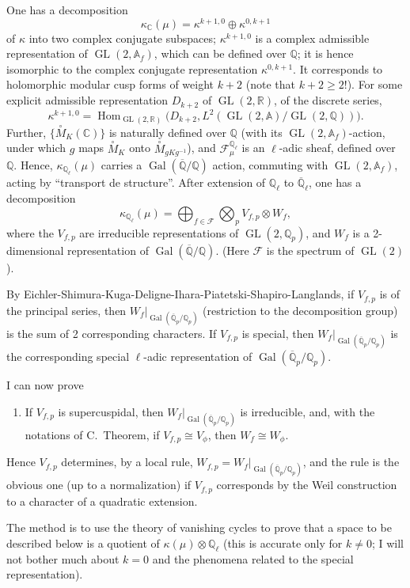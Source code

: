 \documentclass[11pt,a4paper]{article}
\theoremstyle{plain}
\theoremstyle{definition}
\theoremstyle{remark}
\DeclareMathOperator{\Hom}{Hom}
\DeclareMathOperator{\Gal}{Gal}
\DeclareMathOperator{\GL}{GL}
\newcommand{\C}{\mathbb{C}}
\newcommand{\Q}{\mathbb{Q}}
\newcommand{\R}{\mathbb{R}}
\newcommand{\Af}{\mathbb{A}_{f}}
\newcommand{\Qpbar}{\overline{\mathbb{Q}}_{p}}
\newcommand{\Qp}{\mathbb{Q}_{p}}
\newcommand{\Ql}{\mathbb{Q}_{\ell}}
\newcommand{\Qlbar}{\overline{\mathbb{Q}}_{\ell}}
\begin{document}
One has a decomposition
\[
\kappa_{\C}(\mu) = \kappa^{k+1,0} \oplus \kappa^{0,k+1}
\]
of $\kappa$ into two complex conjugate subspaces; $\kappa^{k+1,0}$ is a complex admissible representation of $\GL(2, \Af)$, which can be defined over $\Q$; it is hence isomorphic to the complex conjugate representation $\kappa^{0,k+1}$. It corresponds to holomorphic modular cusp forms of weight $k+2$ (note that $k+2 \geq 2$!). For some explicit admissible representation $D_{k+2}$ of $\GL(2, \R)$, of the discrete series,
\[
\kappa^{k+1,0} = \Hom_{\GL(2, \R)}\bigl(D_{k+2}, L^{2}(\GL(2, \mathbb{A})/\GL(2, \Q))\bigr).
\]
Further, $\{\overset{\circ}{M}_{K}(\C)\}$ is naturally defined over $\Q$ (with its $\GL(2, \Af)$-action, under which $g$ maps $\overset{\circ}{M}_{K}$ onto $\overset{\circ}{M}_{gKg^{-1}}$), and $\mathcal{F}_{\mu}^{\Ql}$ is an $\ell$-adic sheaf, defined over $\Q$. Hence, $\kappa_{\Ql}(\mu)$ carries a $\Gal(\overline{\Q}/\Q)$ action, commuting with $\GL(2, \Af)$, acting by ``transport de structure''. After extension of $\Ql$ to $\Qlbar$, one has a decomposition
\[
\kappa_{\Ql}(\mu) = \bigoplus_{f \in \mathcal{F}} \bigotimes_{p} V_{f,p} \otimes W_{f},
\]
where the $V_{f,p}$ are irreducible representations of $\GL(2, \Qp)$, and $W_{f}$ is a 2-dimensional representation of $\Gal(\overline{\Q}/\Q)$. (Here $\mathcal{F}$ is the spectrum of $\GL(2)$).

By Eichler-Shimura-Kuga-Deligne-Ihara-Piatetski-Shapiro-Langlands, if $V_{f,p}$ is of the principal series, then $W_{f}\big|_{\Gal(\Qpbar/\Qp)}$ (restriction to the decomposition group) is the sum of 2 corresponding characters. If $V_{f,p}$ is special, then $W_{f}\big|_{\Gal(\Qpbar/\Qp)}$ is the corresponding special $\ell$-adic representation of $\Gal(\Qpbar/\Qp)$.

I can now prove

\begin{enumerate}
\item[(A).] If $V_{f,p}$ is supercuspidal, then $W_{f}\big|_{\Gal(\Qpbar/\Qp)}$ is irreducible, and, with the notations of C.\ Theorem, if $V_{f,p} \cong V_{\phi}$, then $W_{f} \cong W_{\phi}$.
\end{enumerate}

Hence $V_{f,p}$ determines, by a local rule, $W_{f,p} = W_{f}\big|_{\Gal(\Qpbar/\Qp)}$, and the rule is the obvious one (up to a normalization) if $V_{f,p}$ corresponds by the Weil construction to a character of a quadratic extension.

The method is to use the theory of vanishing cycles to prove that a space to be described below is a quotient of $\kappa(\mu) \otimes \Ql$ (this is accurate only for $k \neq 0$; I will not bother much about $k = 0$ and the phenomena related to the special representation).
\end{document}
